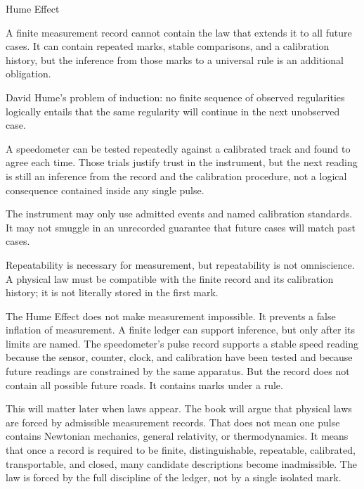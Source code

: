 \begin{phenom}{Hume Effect}
\label{ph:hume-effect}

\PhStatement A finite measurement record cannot contain the law that extends it
to all future cases. It can contain repeated marks, stable comparisons, and a
calibration history, but the inference from those marks to a universal rule is
an additional obligation.

\PhOrigin David Hume's problem of induction: no finite sequence of observed
regularities logically entails that the same regularity will continue in the
next unobserved case.

\PhObservation A speedometer can be tested repeatedly against a calibrated track
and found to agree each time. Those trials justify trust in the instrument, but
the next reading is still an inference from the record and the calibration
procedure, not a logical consequence contained inside any single pulse.

\PhConstraint The instrument may only use admitted events and named calibration
standards. It may not smuggle in an unrecorded guarantee that future cases will
match past cases.

\PhConsequence Repeatability is necessary for measurement, but repeatability is
not omniscience. A physical law must be compatible with the finite record and
its calibration history; it is not literally stored in the first mark.

\end{phenom}

The Hume Effect does not make measurement impossible. It prevents a false
inflation of measurement. A finite ledger can support inference, but only after
its limits are named. The speedometer's pulse record supports a stable speed
reading because the sensor, counter, clock, and calibration have been tested and
because future readings are constrained by the same apparatus. But the record
does not contain all possible future roads. It contains marks under a rule.

This will matter later when laws appear. The book will argue that physical laws
are forced by admissible measurement records. That does not mean one pulse
contains Newtonian mechanics, general relativity, or thermodynamics. It means
that once a record is required to be finite, distinguishable, repeatable,
calibrated, transportable, and closed, many candidate descriptions become
inadmissible. The law is forced by the full discipline of the ledger, not by a
single isolated mark.

